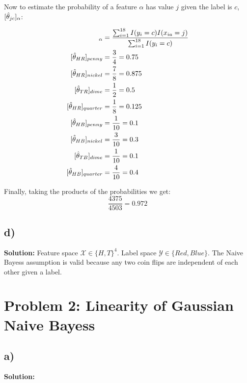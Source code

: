 \documentclass[a4paper]{article}
\begin{document}
Now to estimate the probability of a feature $\alpha$ has value $j$ given the label is $c$, $[\Hat{\theta}_{jc}]_{\alpha}$:

\begin{align*}
[\Hat{\theta}_{jc}]_{\alpha} &= \frac{\sum_{i = 1}^{18}I(y_i = c)I(x_{ia} = j)}{\sum_{i=1}^{18}I(y_i = c)} \\
[\Hat{\theta}_{HR}]_{penny} &= \frac{3}{4} = 0.75 \\
[\Hat{\theta}_{HR}]_{nickel} &= \frac{7}{8} = 0.875 \\
[\Hat{\theta}_{TR}]_{dime} &= \frac{1}{2} = 0.5 \\
[\Hat{\theta}_{HR}]_{quarter} &= \frac{1}{8} = 0.125 \\
[\Hat{\theta}_{HB}]_{penny} &= \frac{1}{10} = 0.1 \\
[\Hat{\theta}_{HB}]_{nickel} &= \frac{3}{10} = 0.3 \\
[\Hat{\theta}_{TB}]_{dime} &= \frac{1}{10} = 0.1 \\
[\Hat{\theta}_{HB}]_{quarter} &= \frac{4}{10} = 0.4
\end{align*}


Finally, taking the products of the probabilities we get:
$$\frac{4375}{4503} = 0.972$$




\subsection*{d)}


\textbf{Solution:}
Feature space $\mathcal{X} \in \{H,T\}^4$. Label space $\mathcal{Y} \in \{Red, Blue\}$. The Naive Bayess assumption is valid because any two coin flips are independent of each other given a label. 


\section*{Problem 2: Linearity of Gaussian Naive Bayess}

\subsection*{a)} 




\textbf{Solution: } 
\end{document}
